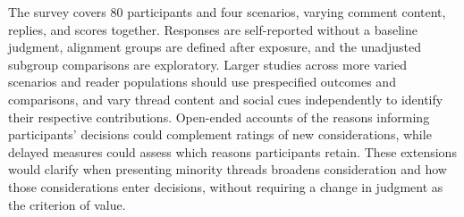 The survey covers $80$ participants and four scenarios, varying comment
content, replies, and scores together. Responses are self-reported without
a baseline judgment, alignment groups are defined after exposure, and the
unadjusted subgroup comparisons are exploratory. Larger studies across
more varied scenarios and reader populations should use prespecified
outcomes and comparisons, and vary thread content and social cues
independently to identify their respective contributions. Open-ended
accounts of the reasons informing participants' decisions could complement
ratings of new considerations, while delayed measures could assess which
reasons participants retain. These extensions would clarify when presenting
minority threads broadens consideration and how those considerations enter
decisions, without requiring a change in judgment as the criterion of value.
